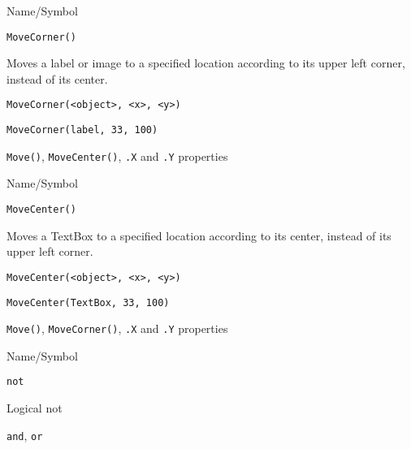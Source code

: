 \rl


\begin{desc}{Name/Symbol}
\item[Name/Symbol]	\verb+MoveCorner()+

\item[Description]	Moves a label or image to a specified location
		according to its upper left corner, instead of its center. 

\item[Usage]
\begin{verbatim}
MoveCorner(<object>, <x>, <y>)
\end{verbatim}

\item[Example]	
\begin{verbatim}
MoveCorner(label, 33, 100)
\end{verbatim}

\item[See Also]	\verb+Move()+, \verb+MoveCenter()+, \verb+.X+ and \verb+.Y+ properties
\end{desc}

\rl




\begin{desc}{Name/Symbol}
\item[Name/Symbol]	\verb+MoveCenter()+

\item[Description]	Moves a TextBox to a specified location
		according to its center, instead of its upper left corner.

\item[Usage]
\begin{verbatim}
MoveCenter(<object>, <x>, <y>)
\end{verbatim}

\item[Example]	
\begin{verbatim}
MoveCenter(TextBox, 33, 100)
\end{verbatim}

\item[See Also]	\verb+Move()+, \verb+MoveCorner()+, \verb+.X+ and \verb+.Y+ properties
\end{desc}

\rl


\begin{desc}{Name/Symbol}
\item[Name/Symbol]	\verb+not+

\item[Description]	Logical not

\item[Usage]		

\item[Example]	

\item[See Also]	\verb+and+, \verb+or+
\end{desc}

